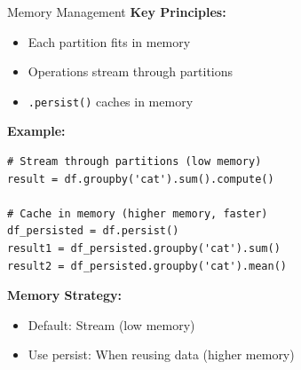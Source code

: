 \documentclass[aspectratio=169]{beamer}
\begin{document}
\begin{frame}[fragile]{Memory Management}
\small
\textbf{Key Principles:}
\begin{itemize}
    \item Each partition fits in memory
    \item Operations stream through partitions
    \item \texttt{.persist()} caches in memory
\end{itemize}

\vspace{0.15cm}
\textbf{Example:}
\begin{lstlisting}
# Stream through partitions (low memory)
result = df.groupby('cat').sum().compute()

# Cache in memory (higher memory, faster)
df_persisted = df.persist()
result1 = df_persisted.groupby('cat').sum()
result2 = df_persisted.groupby('cat').mean()
\end{lstlisting}

\textbf{Memory Strategy:}
\begin{itemize}
    \item Default: Stream (low memory)
    \item Use persist: When reusing data (higher memory)
\end{itemize}
\end{frame}
\end{document}
